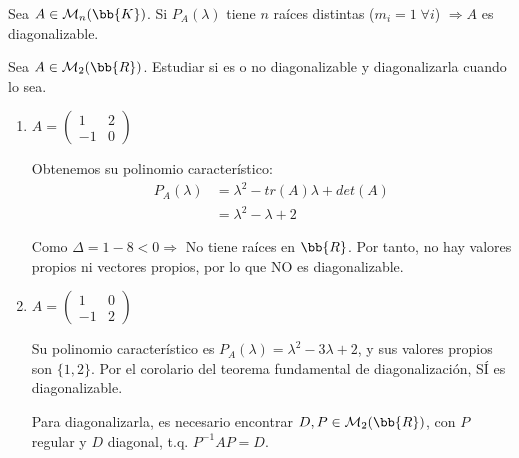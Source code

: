 \begin{coro}
Sea $A\in \mathcal{M}_n{(\bb{K})}$. Si $P_A(\lambda)$ tiene $n$ raíces distintas ($m_i=1 \; \forall i$) $\Longrightarrow A$ es diagonalizable.
\end{coro}

\begin{ejemplo}
    Sea $A\in \mathcal{M}_2(\bb{R})$. Estudiar si es o no diagonalizable y diagonalizarla cuando lo sea.
    \begin{enumerate}
        \item $A = \left( \begin{array}{cc}
            1 & 2 \\
            -1 & 0
        \end{array}\right)$

        Obtenemos su polinomio característico:
        \begin{equation*}
            \begin{split}
                P_A(\lambda) &= \lambda^2 - tr(A)\lambda + det(A) \\
                &= \lambda^2 -\lambda + 2
            \end{split}
        \end{equation*}

        Como $\Delta=1-8<0 \Longrightarrow$ No tiene raíces en $\bb{R}$. Por tanto, no hay valores propios ni vectores propios, por lo que NO es diagonalizable.

        \item $A = \left( \begin{array}{cc}
            1 & 0 \\
            -1 & 2
        \end{array}\right)$
        
       Su polinomio característico es $P_A(\lambda) =\lambda^2 -3\lambda +2$, y sus valores propios son $\{1,2\}$. Por el corolario del teorema fundamental de diagonalización, SÍ es diagonalizable.

       Para diagonalizarla, es necesario encontrar $D,P \in \mathcal{M}_2(\bb{R})$, con $P$ regular y $D$ diagonal, t.q. $P^{-1}AP=D$.


\end{enumerate}
\end{ejemplo}
